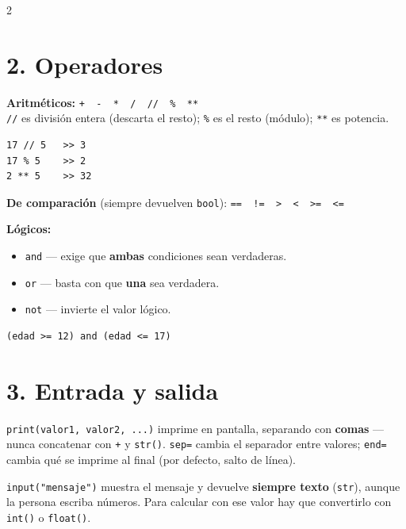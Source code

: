 \documentclass[10pt]{article}
\begin{document}
\begin{multicols}{2}
\section*{2. Operadores}

\textbf{Aritméticos:} \texttt{+ \ - \ * \ / \ // \ \% \ **}\\
\texttt{//} es división entera (descarta el resto); \texttt{\%} es el resto (módulo); \texttt{**} es potencia.

\begin{cajacodigo}
\begin{Verbatim}[fontsize=\footnotesize]
17 // 5   >> 3
17 % 5    >> 2
2 ** 5    >> 32
\end{Verbatim}
\end{cajacodigo}

\textbf{De comparación} (siempre devuelven \texttt{bool}): \texttt{== \ != \ > \ < \ >= \ <=}

\textbf{Lógicos:}
\begin{itemize}
  \item \texttt{and} --- exige que \textbf{ambas} condiciones sean verdaderas.
  \item \texttt{or} --- basta con que \textbf{una} sea verdadera.
  \item \texttt{not} --- invierte el valor lógico.
\end{itemize}

\begin{cajacodigo}
\begin{Verbatim}[fontsize=\footnotesize]
(edad >= 12) and (edad <= 17)
\end{Verbatim}
\end{cajacodigo}

\section*{3. Entrada y salida}

\texttt{print(valor1, valor2, ...)} imprime en pantalla, separando con \textbf{comas} --- nunca concatenar con \texttt{+} y \texttt{str()}. \texttt{sep=} cambia el separador entre valores; \texttt{end=} cambia qué se imprime al final (por defecto, salto de línea).

\texttt{input("mensaje")} muestra el mensaje y devuelve \textbf{siempre texto} (\texttt{str}), aunque la persona escriba números. Para calcular con ese valor hay que convertirlo con \texttt{int()} o \texttt{float()}.


\end{multicols}
\end{document}
